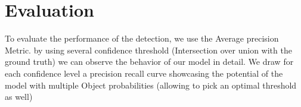 \documentclass[main.tex]{subfiles}
\begin{document}
\section{Evaluation}
To evaluate the performance of the detection, we use the Average precision Metric. by using several confidence threshold (Intersection over union with the ground truth) we can observe the behavior of our model in detail. We draw for each confidence level a precision recall curve showcasing the potential of the model with multiple Object probabilities (allowing to pick an optimal threshold as well)
\end{document}
